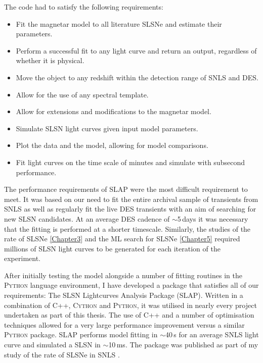 The code had to satisfy the following requirements:
\begin{itemize}
  \item Fit the magnetar model to all literature SLSNe and estimate their parameters.
  \item Perform a successful fit to any light curve and return an output, regardless of whether it is physical.
  \item Move the object to any redshift within the detection range of SNLS and DES.
  \item Allow for the use of any spectral template.
  \item Allow for extensions and modifications to the magnetar model.
  \item Simulate SLSN light curves given input model parameters.
  \item Plot the data and the model, allowing for model comparisons.
  \item Fit light curves on the time scale of minutes and simulate with subsecond performance.
\end{itemize}

The performance requirements of \textsc{SLAP} were the most difficult requirement to meet. It was based on our need to fit the entire archival sample of transients from SNLS as well as regularly fit the live DES transients with an aim of searching for new SLSN candidates. At an average DES cadence of $\sim$5\,days it was necessary that the fitting is performed at a shorter timescale. Similarly, the studies of the rate of SLSNe \cref{Chapter3} and the ML search for SLSNe \cref{Chapter5} required millions of SLSN light curves to be generated for each iteration of the experiment.

After initially testing the model alongside a number of fitting routines in the \textsc{Python} language environment, I have developed a package that satisfies all of our requirements: The SLSN Lightcurves Analysis Package (SLAP). Written in a combination of \textsc{C++}, \textsc{Cython} and \textsc{Python}, it was utilised in nearly every project undertaken as part of this thesis. The use of C++ and a number of optimisation techniques allowed for a very large performance improvement versus a similar \textsc{Python} package. \textsc{SLAP} performs model fitting in $\sim$40\,s for an average SNLS light curve and simulated a SLSN in $\sim$10\,ms. The package was published as part of my study of the rate of SLSNe in SNLS \citep{Prajs2016}.

